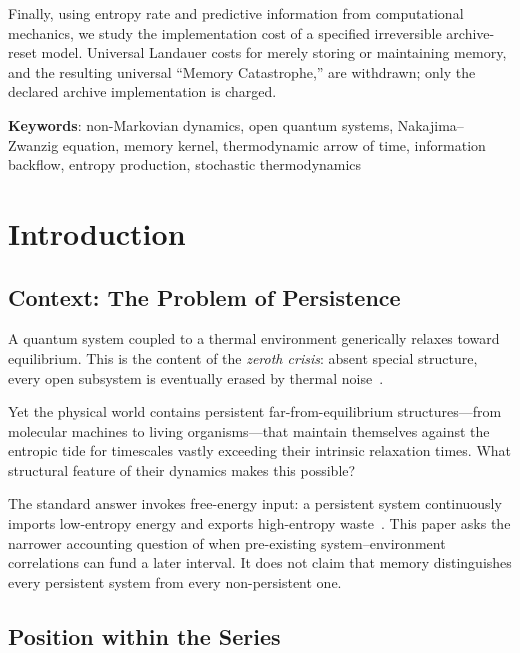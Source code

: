 \documentclass[12pt,a4paper,openany]{book}
\begin{document}
Finally, using entropy rate and predictive information from
computational mechanics, we study the implementation cost of a specified
irreversible archive-reset model.  Universal Landauer costs for merely
storing or maintaining memory, and the resulting universal ``Memory
Catastrophe,'' are withdrawn; only the declared archive implementation
is charged.

\medskip
\noindent\textbf{Keywords}: non-Markovian dynamics, open quantum systems,
Nakajima--Zwanzig equation, memory kernel, thermodynamic arrow of time,
information backflow, entropy production, stochastic thermodynamics


\section{Introduction}
\label{I-sec:intro}

\subsection{Context: The Problem of Persistence}

A quantum system coupled to a thermal environment generically
relaxes toward equilibrium. This is the content of the
\emph{zeroth crisis}: absent special structure, every open
subsystem is eventually erased by thermal noise~\cite{BreuerPetruccione2002}.

Yet the physical world contains persistent far-from-equilibrium
structures---from molecular machines to living organisms---that
maintain themselves against the entropic tide for timescales
vastly exceeding their intrinsic relaxation times. What
structural feature of their dynamics makes this possible?

The standard answer invokes free-energy input: a persistent system
continuously imports low-entropy energy and exports high-entropy
waste~\cite{Schrodinger1944}.  This paper asks the narrower accounting
question of when pre-existing system--environment correlations can fund
a later interval.  It does not claim that memory distinguishes every
persistent system from every non-persistent one.

\subsection{Position within the Series}
\end{document}
